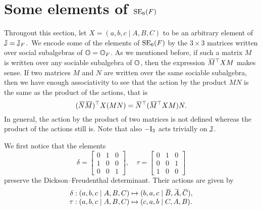 \section{Some elements of $\mathrm{SE}_6(F)$}
\label{section:elts_E6}

Througout this section, let $X = (a,b,c\mid A,B,C)$ to be an arbitrary element of 
$\mathbb{J} = \mathbb{J}_F$.\ We encode some of the elements of $\mathrm{SE}_6(F)$ by the $3\times 3$
 matrices written over
social subalgebras of $\mathbb{O}=\mathbb{O}_{F}$. As we mentioned before, if such a matrix $M$ is written
over any sociable subalgebra of $\mathbb{O}$, then the expression $\mathord{\mbox{\hspace*{0pt}}\,\overline{\!M\!\!\;}\!\:}\mbox{\hspace*{0pt}}^{\top} X M$ makes sense.
If two matrices $M$ and $N$ are written over the same sociable subalgebra, then we have 
enough associativity to see that the action by the product $MN$ is the same as the product
of the actions, that is
\begin{equation}
	(\ovN \ovM)^{\T} X (MN) = \ovN^{\T} (\ovM^{\T} X M) N.
\end{equation} 
In general, the action by the product of two matrices is not defined whereas the product 
of the actions still is. Note that also $-\mathord{\mathrm{I}}_3$ acts trivially on $\mathbb{J}$. 

We first notice that the elements 
\begin{equation}
	\label{eq:delta_tau}
	\delta = \begin{bmatrix}
		0 & 1 & 0 \\
		1 & 0 & 0 \\
		0 & 0 & 1
	\end{bmatrix},\quad 
	\tau = \begin{bmatrix}
		0 & 1 & 0 \\
		0 & 0 & 1 \\
		1 & 0 & 0
	\end{bmatrix}
\end{equation}
preserve the Dickson--Freudenthal determinant. Their actions are given by
\begin{equation}
	\begin{array}{r@{\;}c@{\;}l}
		\delta: (a,b,c\mid A,B,C) & \mapsto & (b,a,c\mid \ovB, \ovA, \ovC), \\
		\tau: (a,b,c\mid A,B,C) & \mapsto & (c,a,b\mid C,A,B). 
	\end{array}
\end{equation}

